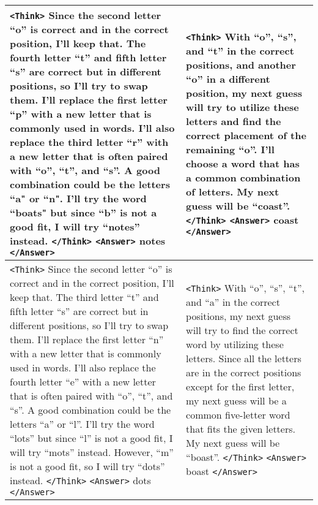 \begin{table*}[h]
{\begin{tabular}{|p{7cm} | p{7cm}|}
        \hline
        \texttt{<Think>} Since the second letter ``o'' is correct and in the correct position, I'll keep that. The fourth letter ``t'' and fifth letter ``s'' are correct but in different positions, so I'll try to swap them. I'll replace the first letter ``p'' with a new letter that is commonly used in words. I'll also replace the third letter ``r'' with a new letter that is often paired with ``o'', ``t'', and ``s''. A good combination could be the letters ``a" or ``n". I'll try the word ``boats" but since ``b'' is not a good fit, I will try ``notes'' instead. \texttt{</Think>} \texttt{<Answer>} notes \texttt{</Answer>} & \texttt{<Think>} With ``o'', ``s'', and ``t'' in the correct positions, and another ``o'' in a different position, my next guess will try to utilize these letters and find the correct placement of the remaining ``o''. I'll choose a word that has a common combination of letters. My next guess will be ``coast''. \texttt{</Think>} \texttt{<Answer>} coast \texttt{</Answer>} \\
        \hline
        \texttt{<Think>} Since the second letter ``o'' is correct and in the correct position, I'll keep that. The third letter ``t'' and fifth letter ``s'' are correct but in different positions, so I'll try to swap them. I'll replace the first letter ``n'' with a new letter that is commonly used in words. I'll also replace the fourth letter ``e'' with a new letter that is often paired with ``o'', ``t'', and ``s''. A good combination could be the letters ``a'' or ``l''. I'll try the word ``lots'' but since ``l'' is not a good fit, I will try ``mots'' instead. However, ``m'' is not a good fit, so I will try ``dots'' instead. \texttt{</Think>} \texttt{<Answer>} dots \texttt{</Answer>}
        & \texttt{<Think>} With ``o'', ``s'', ``t'', and ``a'' in the correct positions, my next guess will try to find the correct word by utilizing these letters. Since all the letters are in the correct positions except for the first letter, my next guess will be a common five-letter word that fits the given letters. My next guess will be ``boast''. \texttt{</Think>} \texttt{<Answer>} boast \texttt{</Answer>} \\
        \hline

\end{tabular}}
\end{table*}
